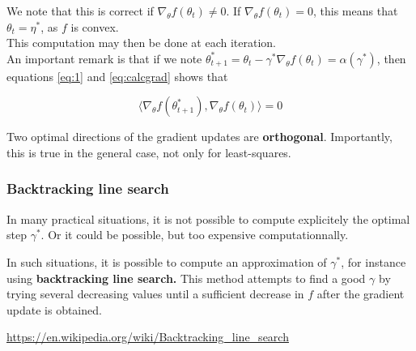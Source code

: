 \documentclass[
10pt, %
a4paper, %
oneside, %
headinclude,footinclude, %
BCOR5mm, %
]{scrartcl}
\begin{document}
We note that this is correct if $ \nabla_{ \theta}f(\theta_t)\neq 0$. If $ \nabla_{\theta}f(\theta_t)=0$, this means that $ \theta_{t}= \eta^*$, as $f$ is convex.
\\

This computation may then be done at each iteration.
\\

An important remark is that if we note $ \theta_{t+1}^* = \theta_{t}- \gamma^* \nabla_{ \theta}f(\theta_t) = \alpha(\gamma^*)$, then equations  \ref{eq:1} and \ref{eq:calcgrad} shows that

\begin{equation}
    \langle\nabla_{\theta}f(\theta_{t+1}^*), \nabla_{ \theta}f(\theta_t) \rangle=0
\end{equation}

Two optimal directions of the gradient updates are \textbf{{orthogonal}}. Importantly, this is true in the general case, not only for least-squares.

\subsubsection{\large\color{Periwinkle}Backtracking line search}

In many practical situations, it is not possible to compute explicitely the optimal step $\gamma^*$. Or it could be possible, but too expensive computationnally.

In such situations, it is possible to compute an approximation of $ \gamma^*$, for instance using \textbf{{backtracking line search.}}  This method attempts to find a good $\gamma$ by trying several decreasing values until a sufficient decrease in $f$ after the gradient update is obtained.

\url{https://en.wikipedia.org/wiki/Backtracking_line_search} 
\end{document}
